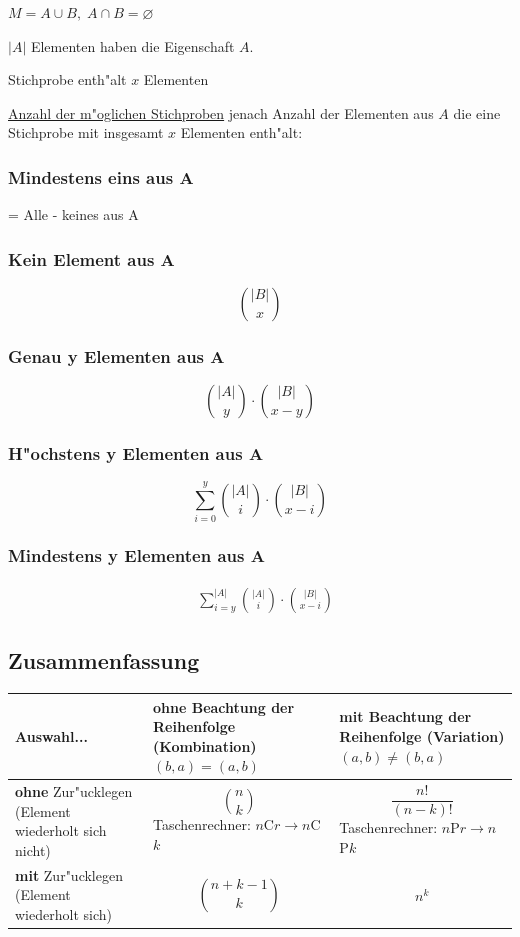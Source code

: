 \documentclass[10pt,a4paper,landscape]{article}
\begin{document}
\begin{multicols*}{3}
		$M = A \cup B, \; A \cap B = \varnothing$
		
		$|A|$ Elementen haben die Eigenschaft $A$.
		
		Stichprobe enth"alt $x$ Elementen
		
		\uline{Anzahl der m"oglichen Stichproben} jenach Anzahl der Elementen 
		aus $A$ die eine Stichprobe
		mit insgesamt $x$ Elementen enth"alt:
		\subsubsection{Mindestens eins aus A}
		= Alle - keines aus A 
		\subsubsection{Kein Element aus A}
		\[ \binom{|B|}{x} \]
		
		\subsubsection{Genau y Elementen aus A}
		\[
		\binom{|A|}{y} \cdot \binom{|B|}{x - y} 
		\]
		
		\subsubsection{H"ochstens y Elementen aus A}
		\[
		\sum_{i = 0}^{y} \binom{|A|}{i} \cdot \binom{|B|}{x - i}
		\]
		
		\subsubsection{Mindestens y Elementen aus A}
		\begin{align*}
		& \sum_{i = y}^{|A|} \binom{|A|}{i} \cdot \binom{|B|}{x - i} 
		\end{align*}
		
		\subsection{Zusammenfassung}
		\begin{tabular}{p{2.65cm} | p{2.65cm} | p{2.65cm}}
			Auswahl...                                                 & \textbf{ohne} Beachtung der Reihenfolge (Kombination) $(b,a) = (a,b)$ & \textbf{mit} Beachtung der Reihenfolge (Variation) $(a,b) \neq (b,a)$ \\
			\hline
			\textbf{ohne} Zur"ucklegen (Element wiederholt sich nicht) & \[ \binom{n}{k} \] Taschenrechner: $n$C$r \rightarrow n$C$k$          & \[ \frac{n!}{(n-k)!} \] Taschenrechner: $n$P$r \rightarrow n$P$k$     \\
			\hline
			\textbf{mit} Zur"ucklegen (Element wiederholt sich)        & \[ \binom{n + k -1}{k} \]                                             & \[ n^k \]                                                             \\
		\end{tabular}

\end{multicols*}
\end{document}
